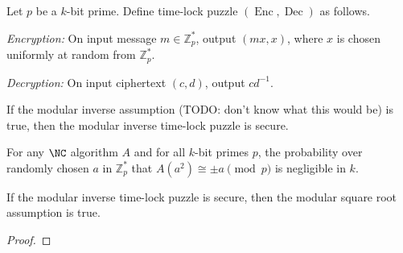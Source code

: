 \documentclass{article}
\newcommand{\Enc}{\operatorname{Enc}}
\newcommand{\Dec}{\operatorname{Dec}}
\newcommand{\Zp}{\mathbb{Z}^*_p}
\begin{document}

\begin{protocol}
  Let $p$ be a $k$-bit prime.
  Define time-lock puzzle $(\Enc, \Dec)$ as follows.

  \emph{Encryption:} On input message $m \in \Zp$, output $(mx, x)$, where $x$ is chosen uniformly at random from $\Zp$.

  \emph{Decryption:} On input ciphertext $(c, d)$, output $cd^{-1}$.
\end{protocol}

\begin{conjecture}
  If the modular inverse assumption (TODO: don't know what this would be) is true, then the modular inverse time-lock puzzle is secure.
\end{conjecture}

\begin{assumption}
  For any $\NC$ algorithm $A$ and for all $k$-bit primes $p$, the probability over randomly chosen $a$ in $\Zp$ that $A(a^2) \cong \pm a \pmod{p}$ is negligible in $k$.
\end{assumption}

\begin{conjecture}
  If the modular inverse time-lock puzzle is secure, then the modular square root assumption is true.
\end{conjecture}
\begin{proof}
\end{proof}
\end{document}
